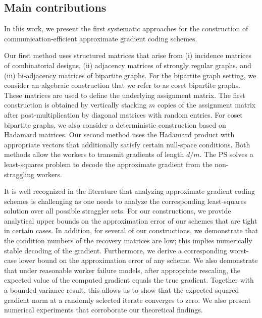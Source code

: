 \documentclass[journal,draftcls,onecolumn]{IEEEtran}
\theoremstyle{mystyle}
\newcommand{\aditya}[1]{\marginpar{+}{\bf Aditya's remark}: {\em #1}}
\begin{document}
\subsection{Main contributions}
In this work, we present the first systematic approaches for the construction of communication-efficient approximate gradient coding schemes.


Our first method uses structured matrices that arise from (i) incidence matrices of combinatorial designs, (ii) adjacency matrices of strongly regular graphs, and (iii) bi-adjacency matrices of bipartite graphs. For the bipartite graph setting, we consider an algebraic construction that we refer to as coset bipartite graphs. These matrices are used to define the underlying assignment matrix. The first construction is obtained by vertically stacking $m$ copies of the assignment matrix after post-multiplication by diagonal matrices with random entries. For coset bipartite graphs, we also consider a deterministic construction based on Hadamard matrices. Our second method uses the Hadamard product with appropriate vectors that additionally satisfy certain null-space conditions.
Both methods allow the workers to transmit gradients of length $d/m$. The PS solves a least-squares problem to decode the approximate gradient from the non-straggling workers.

It is well recognized in the literature \cite{charles2017approximate} that analyzing approximate gradient coding schemes is challenging as one needs to analyze the corresponding least-squares solution over all possible straggler sets. For our constructions, we provide analytical upper bounds on the approximation error of our schemes that are tight in certain cases. In addition, for several of our constructions, we demonstrate that the condition numbers of the recovery matrices are low; this implies numerically stable decoding of the gradient. Furthermore, we derive a corresponding worst-case lower bound on the approximation error of any scheme. We also demonstrate that under reasonable worker failure models, after appropriate rescaling, the expected value of the computed gradient equals the true gradient. Together with a bounded-variance result, this allows us to show that the expected squared gradient norm at a randomly selected iterate converges to zero. We also present numerical experiments that corroborate our theoretical findings.
\end{document}
